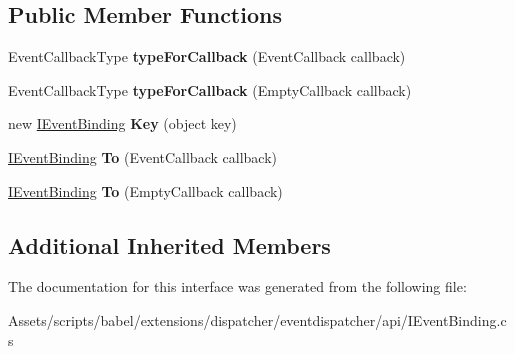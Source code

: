 \subsection*{Public Member Functions}
\begin{DoxyCompactItemize}
\item 
\hypertarget{interfacebabel_1_1extensions_1_1dispatcher_1_1eventdispatcher_1_1api_1_1_i_event_binding_ab087de794f1a13a33e5c3f3f634e0c4c}{Event\-Callback\-Type {\bfseries type\-For\-Callback} (Event\-Callback callback)}\label{interfacebabel_1_1extensions_1_1dispatcher_1_1eventdispatcher_1_1api_1_1_i_event_binding_ab087de794f1a13a33e5c3f3f634e0c4c}

\item 
\hypertarget{interfacebabel_1_1extensions_1_1dispatcher_1_1eventdispatcher_1_1api_1_1_i_event_binding_a0ce7fcf1e89a0d337cd944c4ff851f08}{Event\-Callback\-Type {\bfseries type\-For\-Callback} (Empty\-Callback callback)}\label{interfacebabel_1_1extensions_1_1dispatcher_1_1eventdispatcher_1_1api_1_1_i_event_binding_a0ce7fcf1e89a0d337cd944c4ff851f08}

\item 
\hypertarget{interfacebabel_1_1extensions_1_1dispatcher_1_1eventdispatcher_1_1api_1_1_i_event_binding_afaa0ecbcf35d2a9be40fb1228d00ee5a}{new \hyperlink{interfacebabel_1_1extensions_1_1dispatcher_1_1eventdispatcher_1_1api_1_1_i_event_binding}{I\-Event\-Binding} {\bfseries Key} (object key)}\label{interfacebabel_1_1extensions_1_1dispatcher_1_1eventdispatcher_1_1api_1_1_i_event_binding_afaa0ecbcf35d2a9be40fb1228d00ee5a}

\item 
\hypertarget{interfacebabel_1_1extensions_1_1dispatcher_1_1eventdispatcher_1_1api_1_1_i_event_binding_a559f4d8669986c348959731f92b1e637}{\hyperlink{interfacebabel_1_1extensions_1_1dispatcher_1_1eventdispatcher_1_1api_1_1_i_event_binding}{I\-Event\-Binding} {\bfseries To} (Event\-Callback callback)}\label{interfacebabel_1_1extensions_1_1dispatcher_1_1eventdispatcher_1_1api_1_1_i_event_binding_a559f4d8669986c348959731f92b1e637}

\item 
\hypertarget{interfacebabel_1_1extensions_1_1dispatcher_1_1eventdispatcher_1_1api_1_1_i_event_binding_aed033ce9edb5081eeaab36005207ca4e}{\hyperlink{interfacebabel_1_1extensions_1_1dispatcher_1_1eventdispatcher_1_1api_1_1_i_event_binding}{I\-Event\-Binding} {\bfseries To} (Empty\-Callback callback)}\label{interfacebabel_1_1extensions_1_1dispatcher_1_1eventdispatcher_1_1api_1_1_i_event_binding_aed033ce9edb5081eeaab36005207ca4e}

\end{DoxyCompactItemize}
\subsection*{Additional Inherited Members}


The documentation for this interface was generated from the following file\-:\begin{DoxyCompactItemize}
\item 
Assets/scripts/babel/extensions/dispatcher/eventdispatcher/api/I\-Event\-Binding.\-cs\end{DoxyCompactItemize}
